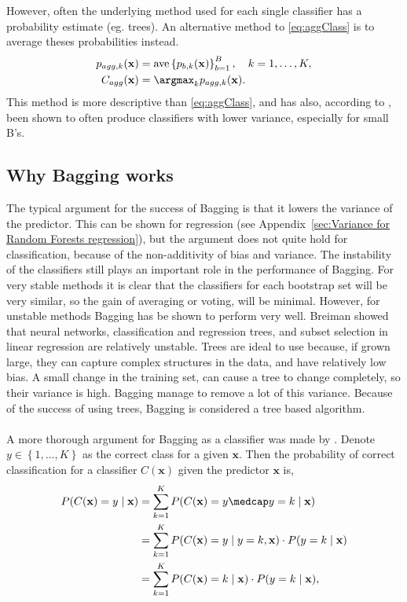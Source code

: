 However, often the underlying method used for each single classifier has a probability estimate (eg. trees). An alternative method to \eqref{eq:aggClass} is to average theses probabilities instead.
\begin{align}
  p_{agg, k}(\mathbf{x}) &=  \mathrm{ave}\left\{ p_{b, k}(\mathbf{x}) \right\}_{b = 1}^{B}, \quad k = 1, \ldots, K, \\
  \label{eq:aggClassP} 
  C_{agg}(\mathbf{x}) &= \argmax_k p_{agg, k}(\mathbf{x}).
\end{align}
This method is more descriptive than \eqref{eq:aggClass}, and has also, according to \cite{modstat}, been shown to often produce classifiers with lower variance, especially for small B's.

\subsection{Why Bagging works}
\label{sub:Why Bagging works}
The typical argument for the success of Bagging is that it lowers the variance of the predictor. This can be shown for regression (see Appendix~\ref{sec:Variance for Random Forests regression}), but the argument does not quite hold for classification, because of the non-additivity of bias and variance. The instability of the classifiers still plays an important role in the performance of Bagging. For very stable methods it is clear that the classifiers for each bootstrap set will be very similar, so the gain of averaging or voting, will be minimal. However, for unstable methods Bagging has be shown to perform very well. Breiman showed that neural networks, classification and regression trees, and subset selection in linear regression are relatively unstable.
Trees are ideal to use because, if grown large, they can capture complex structures in the data, and have relatively low bias. A small change in the training set, can cause a tree to change completely, so their variance is high. Bagging manage to remove a lot of this variance. Because of the success of using trees, Bagging is considered a tree based algorithm.
\\
\\
A more thorough argument for Bagging as a classifier was made by \cite{Breiman1996}. Denote $y \in \left\{ 1, \ldots, K \right\}$ as the correct class for a given $\mathbf{x}$. Then the probability of correct classification for a classifier $C(\mathbf{x})$ given the predictor $\mathbf{x}$ is,
\begin{align}
  P(C(\mathbf{x}) = y \mid \mathbf{x})  &= \sum^{K}_{k=1} P(C(\mathbf{x})=y \medcap y = k \mid \mathbf{x}) \notag \\
  &= \sum^{K}_{k=1} P(C(\mathbf{x}) = y \mid y = k, \mathbf{x}) \cdot P(y=k \mid \mathbf{x}) \notag \\
  &= \sum^{K}_{k=1} P(C(\mathbf{x}) = k \mid \mathbf{x}) \cdot P(y=k \mid \mathbf{x}), 
\end{align}
